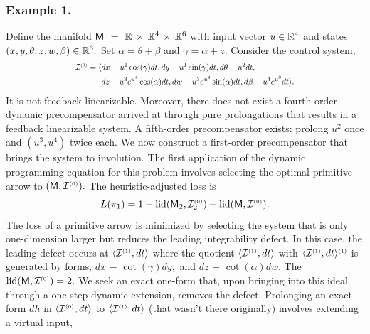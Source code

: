 \documentclass[a4paper]{ifacconf}
\begin{document}
\subsubsection{Example 1.}
Define the manifold \(\mathsf{M}\) \(=\) \(\mathbb{R}\) \(\times\) \(\mathbb{R}^4\) \(\times\) \(\mathbb{R}^6\) with input vector \(u \in \mathbb{R}^4\) and states \((x,y,\theta,z,w,\beta) \in \mathbb{R}^6.\)
Set \(\alpha = \theta + \beta\) and \(\gamma = \alpha + z.\)
Consider the control system,
\[
  \scalebox{0.8}{\mbox{\ensuremath{\displaystyle%
    \begin{aligned}
    \Ideal{I}^{\smash{\scriptscriptstyle(0)}}
      = \langle
        & dx - u^1\cos(\gamma) dt,
          dy - u^1\sin(\gamma) dt,
          d\theta - u^2 dt,\\
        & dz - u^3 e^{u^4} \cos(\alpha) dt,
        dw - u^3 e^{u^4} \sin(\alpha) dt,
        d\beta - u^4 e^{u^3} dt
      \rangle.
    \end{aligned}
  }}}
\]
It is not feedback linearizable.
Moreover, there does not exist a fourth-order dynamic precompensator arrived at through pure prolongations that results in a feedback linearizable system.
A fifth-order precompensator exists: prolong \(u^2\) once and \((u^3, u^4)\) twice each.
We now construct a first-order precompensator that brings the system to involution.
%
The first application of the dynamic programming equation for this problem involves selecting the optimal primitive arrow to \((\mathsf{M}, \mathcal{I}^{\smash{\scriptscriptstyle(0)}}).\)
The heuristic-adjusted loss is
\begin{equation}
  \label{eqn:ex:loss}
  L(\pi_1) = 1 - \operatorname{lid}(\mathsf{M}_2, \mathcal{I}^{\smash{\scriptscriptstyle(0)}}_2) + \operatorname{lid}(\mathsf{M}, \mathcal{I}^{\smash{\scriptscriptstyle(0)}}).
\end{equation}
The loss of a primitive arrow is minimized by selecting the system that is only one-dimension larger but reduces the leading integrability defect.
In this case, the leading defect occurs at \(\langle \mathcal{I}^{\smash{\scriptscriptstyle(1)}}, dt\rangle\) where the quotient \(\langle \mathcal{I}^{\smash{\scriptscriptstyle(1)}}, dt\rangle\) with \(\langle \mathcal{I}^{\smash{\scriptscriptstyle(1)}}, dt\rangle^{\smash{\scriptscriptstyle(1)}}\) is generated by forms, \(dx\) \(-\) \(\cot(\gamma) dy,\) and \(dz\) \(-\) \(\cot(\alpha) dw.\)
The \(\operatorname{lid}(\mathsf{M}, \mathcal{I}^{\smash{\scriptscriptstyle(0)}}) = 2.\)
We seek an exact one-form that, upon bringing into this ideal through a one-step dynamic extension, removes the defect.
Prolonging an exact form \(dh\) in \(\langle \mathcal{I}^{\smash{\scriptscriptstyle(0)}}, dt \rangle\) to \(\langle \mathcal{I}^{\smash{\scriptscriptstyle(1)}}, dt\rangle\) (that wasn't there originally) involves extending a virtual input,
\end{document}

